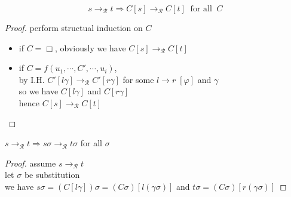 \documentclass[12pt,aspectratio=169]{beamer}
\newcommand{\RR}{\mathcal{R}}
\begin{document}
\begin{frame}
    \begin{theorem}
        \[
            s \to_{\RR} t \Rightarrow C[s] \to_{\RR} C[t] \;\; \text{for all} \;\; C 
        \]
    \end{theorem}
    \begin{proof}
        perform structual induction on $C$\\
        \begin{itemize}
            \item if $C=\Box$, obviously we have $C[s] \to_{\RR} C[t]$
            \item if $C=f(u_1,\cdots,C',\cdots,u_i)$,\\
                by I.H. $C'[l\gamma] \to_{\RR} C'[r\gamma]$ for some $l \to r \; [\varphi]$ and $\gamma$\\
                so we have $C[l\gamma]$ and $C[r\gamma]$\\
                hence $C[s] \to_{\RR} C[t]$

        \end{itemize}
    \end{proof}
\end{frame}

\begin{frame}
    \begin{theorem}
            $s \to_{\RR} t \Rightarrow s\sigma \to_{\RR} t\sigma$ for all $\sigma$
    \end{theorem}
    \begin{proof}
        assume $s \to_{\RR} t$\\
        let $\sigma$ be substitution\\
        we have $s\sigma = (C[l\gamma])\sigma = (C\sigma)[l(\gamma\sigma)]$ and $t\sigma = (C\sigma)[r(\gamma\sigma)]$

    \end{proof}

\end{frame}
\end{document}
